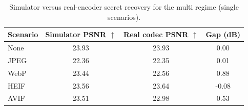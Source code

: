 \begin{table}[t]
\centering
\caption{Simulator versus real-encoder secret recovery for the multi regime (single scenarios).}
\label{tab:multi-single-gap}
\begin{tabular}{lccc}
\toprule
Scenario & Simulator PSNR $\uparrow$ & Real codec PSNR $\uparrow$ & Gap (dB) \\
\midrule
None & 23.93 & 23.93 & 0.00 \\
JPEG & 22.36 & 22.35 & 0.01 \\
WebP & 23.44 & 22.56 & 0.88 \\
HEIF & 23.56 & 23.64 & -0.08 \\
AVIF & 23.51 & 22.98 & 0.53 \\
\bottomrule
\end{tabular}
\end{table}
